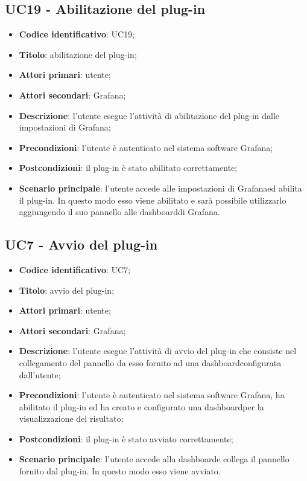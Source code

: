 \subsection{UC19 - Abilitazione del plug-in}
\begin{itemize}
	\item \textbf{Codice identificativo}: UC19;
	\item \textbf{Titolo}: abilitazione del plug-in;
	\item \textbf{Attori primari}: utente;
	\item \textbf{Attori secondari}: Grafana\glo;
	\item \textbf{Descrizione}: l'utente esegue l'attività di abilitazione del plug-in dalle impostazioni di Grafana\glo;
	\item \textbf{Precondizioni}: l'utente è autenticato nel sistema software Grafana\glo;
	\item \textbf{Postcondizioni}: il plug-in è stato abilitato correttamente;
	\item \textbf{Scenario principale}: l'utente accede alle impostazioni di Grafana\glosp ed abilita il plug-in. In questo modo esso viene abilitato e sarà possibile utilizzarlo aggiungendo il suo pannello alle dashboard\glosp di Grafana\glo.
\end{itemize}

\subsection{UC7 - Avvio del plug-in}
\begin{itemize}
	\item \textbf{Codice identificativo}: UC7;
	\item \textbf{Titolo}: avvio del plug-in;
	\item \textbf{Attori primari}: utente;
	\item \textbf{Attori secondari}: Grafana\glo;
	\item \textbf{Descrizione}: l'utente esegue l'attività di avvio del plug-in che consiste nel collegamento del pannello da esso fornito ad una dashboard\glosp configurata dall'utente;
	\item \textbf{Precondizioni}: l'utente è autenticato nel sistema software Grafana\glo, ha abilitato il plug-in ed ha creato e configurato una dashboard\glosp per la visualizzazione del risultato;
	\item \textbf{Postcondizioni}: il plug-in è stato avviato correttamente;
	\item \textbf{Scenario principale}: l'utente accede alla dashboard\glosp e collega il pannello fornito dal plug-in. In questo modo esso viene avviato.
\end{itemize}
